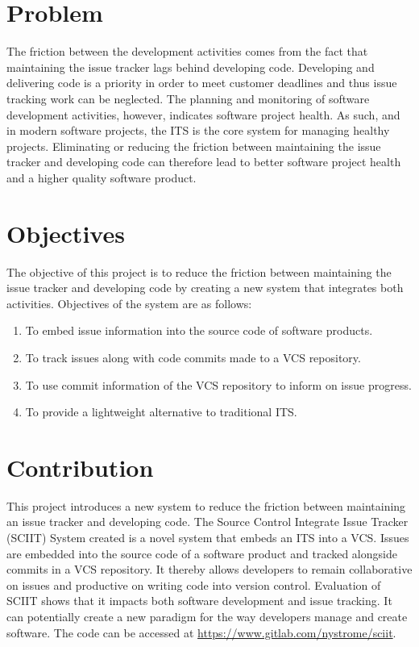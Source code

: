 \documentclass{mproj}
\begin{document}
\section{Problem}

The friction between the development activities comes from the fact that maintaining the issue tracker lags behind developing code. Developing and delivering code is a priority in order to meet customer deadlines and thus issue tracking work can be neglected. The planning and monitoring of software development activities, however, indicates software project health. As such, and in modern software projects, the ITS is the core system for managing healthy projects. Eliminating or reducing the friction between maintaining the issue tracker and developing code can therefore lead to better software project health and a higher quality software product.



\section{Objectives}

The objective of this project is to reduce the friction between maintaining the issue tracker and developing code by creating a new system that integrates both activities. Objectives of the system are as follows:

\begin{enumerate}
  \item To embed issue information into the source code of software products.
  \item To track issues along with code commits made to a VCS repository.
  \item To use commit information of the VCS repository to inform on issue progress.
  \item To provide a lightweight alternative to traditional ITS.
\end{enumerate}


\section{Contribution}

This project introduces a new system to reduce the friction between maintaining an issue tracker and developing code. The Source Control Integrate Issue Tracker (SCIIT) System created is a novel system that embeds an ITS into a VCS. Issues are embedded into the source code of a software product and tracked alongside commits in a VCS repository. It thereby allows developers to remain collaborative on issues and productive on writing code into version control. Evaluation of SCIIT shows that it impacts both software development and issue tracking. It can potentially create a new paradigm for the way developers manage and create software. The code can be accessed at \href{https://www.gitlab.com/nystrome/sciit}{https://www.gitlab.com/nystrome/sciit}.
\end{document}
